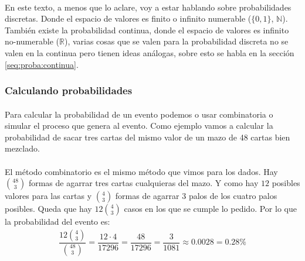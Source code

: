 \documentclass[../main.tex]{subfiles}
\begin{document}
\paragraph{} En este texto, a menos que lo aclare, voy a estar hablando sobre probabilidades discretas. Donde el espacio de valores es finito o infinito numerable (\(\{0, 1\}\), \(\mathbb{N}\)). También existe la probabilidad continua, donde el espacio de valores es infinito no-numerable (\(\mathbb{R}\)), varias cosas que se valen para la probabilidad discreta no se valen en la continua pero tienen ideas análogas, sobre esto se habla en la sección \ref{seq:proba:continua}. %

\subsubsection{Calculando probabilidades}
\paragraph{} Para calcular la probabilidad de un evento podemos o usar combinatoria o simular el proceso que genera al evento. Como ejemplo vamos a calcular la probabilidad de sacar tres cartas del mismo valor de un mazo de 48 cartas bien mezclado.

\paragraph{} El método combinatorio es el mismo método que vimos para los dados. Hay \(\binom{48}{3}\) formas de agarrar tres cartas cualquieras del mazo. Y como hay \(12\) posibles valores para las cartas y \(\binom{4}{3}\) formas de agarrar 3 palos de los cuatro palos posibles. Queda que hay \(12\binom{4}{3}\) casos en los que se cumple lo pedido. Por lo que la probabilidad del evento es:
\begin{gather*}
  \dfrac{12\binom{4}{3}}{\binom{48}{3}} = \dfrac{12 \cdot 4}{17296} = \dfrac{48}{17296} = \dfrac{3}{1081} \approx 0.0028 = 0.28\%
\end{gather*}
\end{document}
